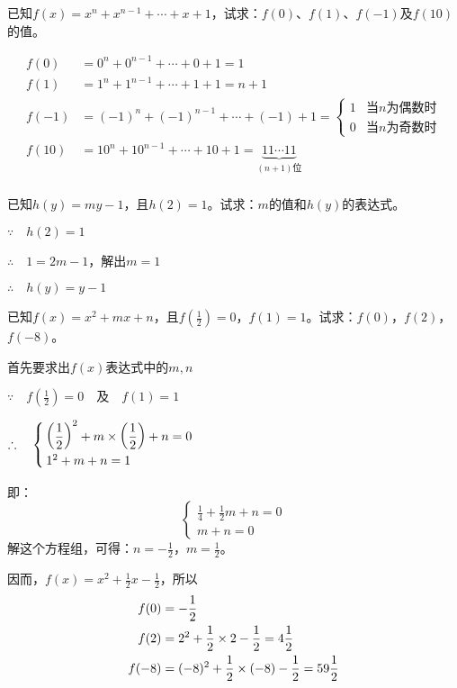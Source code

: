 \begin{example}
已知$f(x)=x^n+x^{n-1}+\cdots+x+1$，试求：$f(0)$、$f(1)$、$f(-1)$及$f(10)$的值。
\end{example}

\begin{solution}
\[\begin{split}
    f(0)&=0^n+0^{n-1}+\cdots +0+1=1\\
    f(1)&=1^n+1^{n-1}+\cdots +1+1=n+1\\
    f(-1)&=(-1)^n+(-1)^{n-1}+\cdots +(-1)+1=\begin{cases}
        1   & \text{当$n$为偶数时} \\
        0  &  \text{当$n$为奇数时}
    \end{cases}\\
    f(10)&=10^n+10^{n-1}+\cdots +10+1=\underbrace{11\cdots 11}_{(n+1)\text{位}} \\
\end{split}\]       
    
\end{solution}


\begin{example}
已知$h(y)=my-1$，且$h(2)=1$。试求：$m$的值和$h(y)$的表达式。
\end{example}

\begin{solution}
        $\because\quad h(2)=1$ 

$\therefore\quad 1=2m-1$，解出$m=1$

        $\therefore\quad h(y)=y-1$    
\end{solution}


\begin{example}
已知$f(x)=x^2+mx+n$，且$f\left(\frac{1}{2}\right)=0$，$f(1)=1$。试求：$f(0)$，$f(2)$，$f(-8)$。
\end{example}

\begin{solution}
   首先要求出$f(x)$表达式中的$m,n$
   
   $\because\quad f\left(\frac{1}{2}\right)=0\quad \text{及}\quad f(1)=1$

   $\therefore\quad \begin{cases}
    \left(\dfrac{1}{2}\right)^2+m\times \left(\dfrac{1}{2}\right)+n=0\\
    1^2+m+n=1
   \end{cases}$

即：    
\[\begin{cases}
    \frac{1}{4}+\frac{1}{2}m+n=0\\
    m+n=0
\end{cases} \]
解这个方程组，可得：$n=-\frac{1}{2}$，$m=\frac{1}{2}$。

因而，$f(x)=x^2+\frac{1}{2}x-\frac{1}{2}$，所以
\[\begin{split}
    f(0)&= -\dfrac{1}{2}\\
    f(2)&=2^2+\dfrac{1}{2}\times 2-\dfrac{1}{2}=4\dfrac{1}{2}\\
    f(-8)&=(-8)^2+\dfrac{1}{2}\times (-8)-\dfrac{1}{2}=59\dfrac{1}{2}
\end{split}\]
\end{solution}

